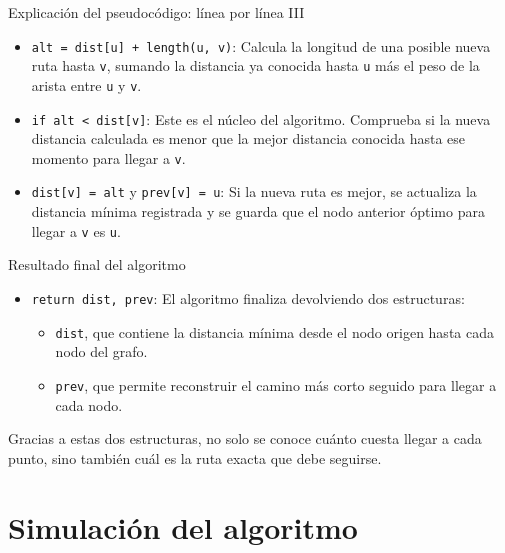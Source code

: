 \documentclass{beamer}
\begin{document}
    \begin{frame}{Explicación del pseudocódigo: línea por línea III}
        \begin{itemize}
            \item \texttt{alt = dist[u] + length(u, v)}: Calcula la longitud de una posible nueva ruta hasta \texttt{v}, sumando la distancia ya conocida hasta \texttt{u} más el peso de la arista entre \texttt{u} y \texttt{v}.
            
            \item \texttt{if alt < dist[v]}: Este es el núcleo del algoritmo. Comprueba si la nueva distancia calculada es menor que la mejor distancia conocida hasta ese momento para llegar a \texttt{v}.
            
            \item \texttt{dist[v] = alt} y \texttt{prev[v] = u}: Si la nueva ruta es mejor, se actualiza la distancia mínima registrada y se guarda que el nodo anterior óptimo para llegar a \texttt{v} es \texttt{u}.
        \end{itemize}
    \end{frame}

    \begin{frame}{Resultado final del algoritmo}
        \begin{itemize}
            \item \texttt{return dist, prev}: El algoritmo finaliza devolviendo dos estructuras:
            \begin{itemize}
                \item \texttt{dist}, que contiene la distancia mínima desde el nodo origen hasta cada nodo del grafo.
                \item \texttt{prev}, que permite reconstruir el camino más corto seguido para llegar a cada nodo.
            \end{itemize}
        \end{itemize}
        
        \vspace{0.3cm}
        Gracias a estas dos estructuras, no solo se conoce cuánto cuesta llegar a cada punto, sino también cuál es la ruta exacta que debe seguirse.
    \end{frame}

    \section{Simulación del algoritmo}
\end{document}
